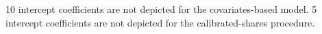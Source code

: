 10 intercept coefficients are not depicted for the covariates-based model.
5 intercept coefficients are not depicted for the calibrated-shares procedure.